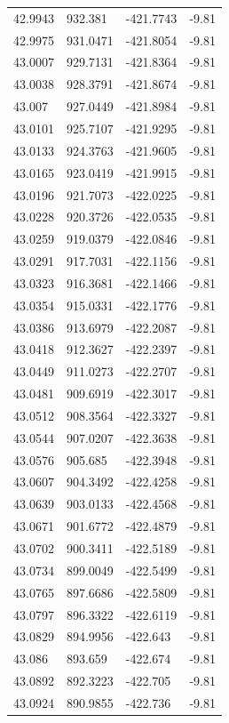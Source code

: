 \begin{table}[H]
\begin{tabular}{llll}
42.9943 & 932.381 & -421.7743 & -9.81 \\
42.9975 & 931.0471 & -421.8054 & -9.81 \\
43.0007 & 929.7131 & -421.8364 & -9.81 \\
43.0038 & 928.3791 & -421.8674 & -9.81 \\
43.007 & 927.0449 & -421.8984 & -9.81 \\
43.0101 & 925.7107 & -421.9295 & -9.81 \\
43.0133 & 924.3763 & -421.9605 & -9.81 \\
43.0165 & 923.0419 & -421.9915 & -9.81 \\
43.0196 & 921.7073 & -422.0225 & -9.81 \\
43.0228 & 920.3726 & -422.0535 & -9.81 \\
43.0259 & 919.0379 & -422.0846 & -9.81 \\
43.0291 & 917.7031 & -422.1156 & -9.81 \\
43.0323 & 916.3681 & -422.1466 & -9.81 \\
43.0354 & 915.0331 & -422.1776 & -9.81 \\
43.0386 & 913.6979 & -422.2087 & -9.81 \\
43.0418 & 912.3627 & -422.2397 & -9.81 \\
43.0449 & 911.0273 & -422.2707 & -9.81 \\
43.0481 & 909.6919 & -422.3017 & -9.81 \\
43.0512 & 908.3564 & -422.3327 & -9.81 \\
43.0544 & 907.0207 & -422.3638 & -9.81 \\
43.0576 & 905.685 & -422.3948 & -9.81 \\
43.0607 & 904.3492 & -422.4258 & -9.81 \\
43.0639 & 903.0133 & -422.4568 & -9.81 \\
43.0671 & 901.6772 & -422.4879 & -9.81 \\
43.0702 & 900.3411 & -422.5189 & -9.81 \\
43.0734 & 899.0049 & -422.5499 & -9.81 \\
43.0765 & 897.6686 & -422.5809 & -9.81 \\
43.0797 & 896.3322 & -422.6119 & -9.81 \\
43.0829 & 894.9956 & -422.643 & -9.81 \\
43.086 & 893.659 & -422.674 & -9.81 \\
43.0892 & 892.3223 & -422.705 & -9.81 \\
43.0924 & 890.9855 & -422.736 & -9.81 \\

\end{tabular}
\end{table}
